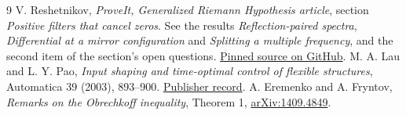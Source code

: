 \documentclass[11pt]{article}
\begin{document}
\begin{thebibliography}{9}
 V. Reshetnikov, \emph{ProveIt, Generalized Riemann Hypothesis
article}, section \emph{Positive filters that cancel zeros}. See the results
\emph{Reflection-paired spectra}, \emph{Differential at a mirror configuration}
and \emph{Splitting a multiple frequency}, and the second item of the section's
open questions.
\href{https://github.com/VladimirReshetnikov/ProveIt/blob/00cadb961bbe77c74e5d082c4948f8884d58a970/Analysis/GeneralizedRiemannHypothesis/Article/sections/fil.tex}{Pinned source on GitHub}.
 M. A. Lau and L. Y. Pao, \emph{Input shaping and time-optimal
control of flexible structures}, Automatica 39 (2003), 893--900.
\href{https://doi.org/10.1016/S0005-1098(03)00024-4}{Publisher record}.
 A. Eremenko and A. Fryntov, \emph{Remarks on the Obrechkoff
inequality}, Theorem 1, \href{https://arxiv.org/abs/1409.4849}{arXiv:1409.4849}.
\end{thebibliography}
\end{document}

